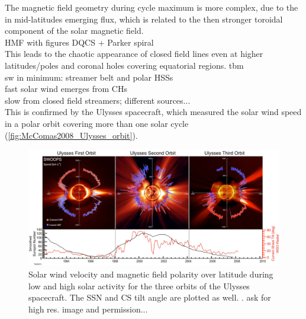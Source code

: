 The magnetic field geometry during cycle maximum is more complex, due to the in mid-latitudes emerging flux, which is related to the then stronger toroidal component of the solar magnetic field.\\

HMF with figures DQCS + Parker spiral\\

This leads to the chaotic appearance of closed field lines even at higher latitudes/poles and coronal holes covering equatorial regions. tbm\\

sw in minimum: streamer belt and polar HSSs\\

fast solar wind emerges from CHs\\

slow from closed field streamers; different sources...\\

This is confirmed by the Ulysses spacecraft, which measured the solar wind speed in a polar orbit covering more than one solar cycle (\autoref{fig:McComas2008_Ulysses_orbit}).\\
\begin{figure}[htb]
	\centering
	\includegraphics[width=\textwidth]{images/McComas2008_Ulysses_orbit_.png}
	\caption{Solar wind velocity and magnetic field polarity over latitude during low and high solar activity for the three orbits of the Ulysses spacecraft. The SSN and CS tilt angle are plotted as well. \citep[Fig.~1]{McComas2008}. ask for high res. image and permission...}
	\label{fig:McComas2008_Ulysses_orbit}
\end{figure}

